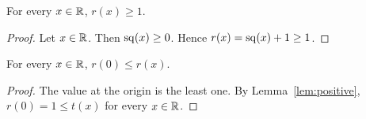 \begin{lemma}\label{lem:positive}
For every $x\in\mathbb{R}$, $r(x)\ge1$.
\end{lemma}

\begin{proof}
Let $x\in\mathbb{R}$.
Then $\operatorname{sq}(x)\ge0$.
Hence $r(x)=\operatorname{sq}(x)+1\ge1$.
\end{proof}

\begin{proposition}\label{prop:minimum}
For every $x\in\mathbb{R}$, $r(0)\le r(x)$.
\end{proposition}

\begin{proof}
The value at the origin is the least one.
By Lemma~\ref{lem:positive}, $r(0)=1\le t(x)$ for every $x\in\mathbb{R}$.
\end{proof}
